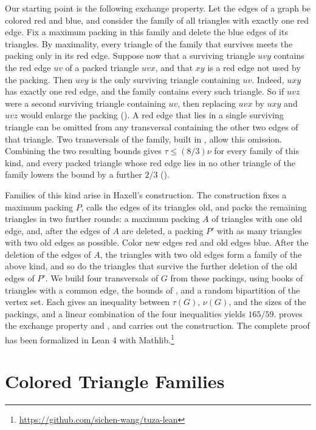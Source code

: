 \documentclass[11pt]{article}
\theoremstyle{remark}
\begin{document}
Our starting point is the following exchange property. Let the edges of a graph be colored red and blue, and consider the family of all triangles with exactly one red edge. Fix a maximum packing in this family and delete the blue edges of its triangles. By maximality, every triangle of the family that survives meets the packing only in its red edge. Suppose now that a surviving triangle $uvy$ contains the red edge $uv$ of a packed triangle $uvx$, and that $xy$ is a red edge not used by the packing. Then $uvy$ is the only surviving triangle containing $uv$. Indeed, $uxy$ has exactly one red edge, and the family contains every such triangle. So if $uvz$ were a second surviving triangle containing $uv$, then replacing $uvx$ by $uxy$ and $uvz$ would enlarge the packing (). A red edge that lies in a single surviving triangle can be omitted from any transversal containing the other two edges of that triangle. Two transversals of the family, built in , allow this omission. Combining the two resulting bounds gives $\tau\le(8/3)\nu$ for every family of this kind, and every packed triangle whose red edge lies in no other triangle of the family lowers the bound by a further $2/3$ ().

Families of this kind arise in Haxell's construction. The construction fixes a maximum packing $P$, calls the edges of its triangles old, and packs the remaining triangles in two further rounds: a maximum packing $A$ of triangles with one old edge, and, after the edges of $A$ are deleted, a packing $P'$ with as many triangles with two old edges as possible. Color new edges red and old edges blue. After the deletion of the edges of $A$, the triangles with two old edges form a family of the above kind, and so do the triangles that survive the further deletion of the old edges of $P'$. We build four transversals of $G$ from these packings, using books of triangles with a common edge, the bounds of , and a random bipartition of the vertex set. Each gives an inequality between $\tau(G)$, $\nu(G)$, and the sizes of the packings, and a linear combination of the four inequalities yields $165/59$.  proves the exchange property and , and  carries out the construction. The complete proof has been formalized in Lean 4 with Mathlib.\footnote{\url{https://github.com/sichen-wang/tuza-lean}}

\section{Colored Triangle Families}\label{sec:colored}
\end{document}
